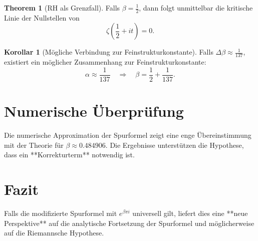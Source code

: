 \documentclass{article}
\theoremstyle{definition}
\newtheorem{theorem}{Theorem}
\newtheorem{corollary}{Korollar}
\begin{document}
\begin{theorem}[RH als Grenzfall]
Falls \( \beta = \frac{1}{2} \), dann folgt unmittelbar die kritische Linie der Nullstellen von
\begin{equation}
    \zeta\left( \frac{1}{2} + it \right) = 0.
\end{equation}
\end{theorem}

\begin{corollary}[Mögliche Verbindung zur Feinstrukturkonstante]
Falls \( \Delta\beta \approx \frac{1}{137} \), existiert ein möglicher Zusammenhang zur Feinstrukturkonstante:
\begin{equation}
    \alpha \approx \frac{1}{137} \quad \Rightarrow \quad \beta = \frac{1}{2} + \frac{1}{137}.
\end{equation}
\end{corollary}

\section{Numerische Überprüfung}

Die numerische Approximation der Spurformel zeigt eine enge Übereinstimmung mit der Theorie für \( \beta \approx 0.484906 \). Die Ergebnisse unterstützen die Hypothese, dass ein **Korrekturterm** notwendig ist.

\section{Fazit}

Falls die modifizierte Spurformel mit \( e^{\beta \pi i} \) universell gilt, liefert dies eine **neue Perspektive** auf die analytische Fortsetzung der Spurformel und möglicherweise auf die Riemannsche Hypothese.
\end{document}
